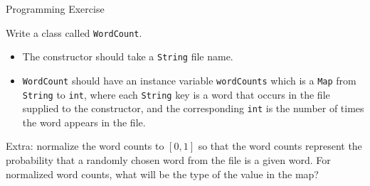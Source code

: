 \documentclass{beamer}
\begin{document}
\begin{frame}[fragile]{Programming Exercise}

Write a class called {\tt WordCount}.
\begin{itemize}
\item The constructor should take a {\tt String} file name.
\item {\tt WordCount} should have an instance variable {\tt wordCounts} which is a {\tt Map} from {\tt String} to {\tt int}, where each {\tt String} key is a word that occurs in the file supplied to the constructor, and the corresponding {\tt int} is the number of times the word appears in the file.
\end{itemize}
Extra: normalize the word counts to $[0, 1]$ so that the word counts represent the probability that a randomly chosen word from the file is a given word.  For normalized word counts, what will be the type of the value in the map?
\end{frame}








\end{document}
